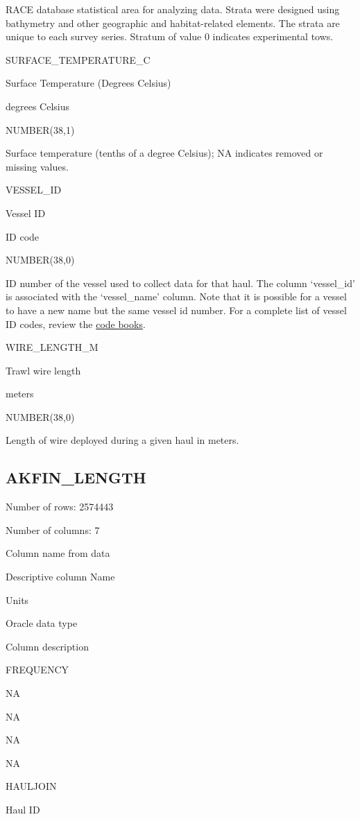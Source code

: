 \documentclass[
  letterpaper,
  oneside,
  open=any]{scrbook}
\begin{document}
RACE database statistical area for analyzing data. Strata were designed
using bathymetry and other geographic and habitat-related elements. The
strata are unique to each survey series. Stratum of value 0 indicates
experimental tows.

SURFACE\_TEMPERATURE\_C

Surface Temperature (Degrees Celsius)

degrees Celsius

NUMBER(38,1)

Surface temperature (tenths of a degree Celsius); NA indicates removed
or missing values.

VESSEL\_ID

Vessel ID

ID code

NUMBER(38,0)

ID number of the vessel used to collect data for that haul. The column
`vessel\_id' is associated with the `vessel\_name' column. Note that it
is possible for a vessel to have a new name but the same vessel id
number. For a complete list of vessel ID codes, review the
\href{https://www.fisheries.noaa.gov/resource/document/groundfish-survey-species-code-manual-and-data-codes-manual}{code
books}.

WIRE\_LENGTH\_M

Trawl wire length

meters

NUMBER(38,0)

Length of wire deployed during a given haul in meters.

\hypertarget{akfin_length}{%
\subsection{AKFIN\_LENGTH}\label{akfin_length}}

Number of rows: 2574443

Number of columns: 7

Column name from data

Descriptive column Name

Units

Oracle data type

Column description

FREQUENCY

NA

NA

NA

NA

HAULJOIN

Haul ID
\end{document}

